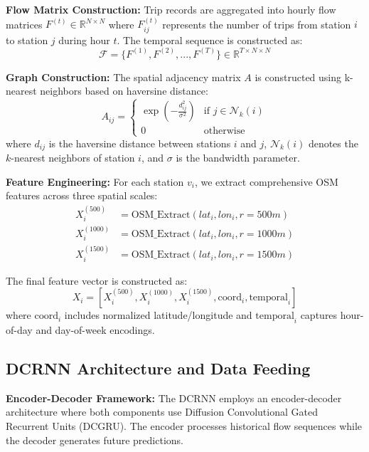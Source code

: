 \documentclass[twocolumn,11pt]{IEEEtran}
\begin{document}
\textbf{Flow Matrix Construction:}
Trip records are aggregated into hourly flow matrices $F^{(t)} \in \mathbb{R}^{N \times N}$ where $F_{ij}^{(t)}$ represents the number of trips from station $i$ to station $j$ during hour $t$. The temporal sequence is constructed as:
\begin{equation}
\mathcal{F} = \{F^{(1)}, F^{(2)}, ..., F^{(T)}\} \in \mathbb{R}^{T \times N \times N}
\end{equation}

\textbf{Graph Construction:}
The spatial adjacency matrix $A$ is constructed using k-nearest neighbors based on haversine distance:
\begin{equation}
A_{ij} = \begin{cases}
\exp(-\frac{d_{ij}^2}{\sigma^2}) & \text{if } j \in \mathcal{N}_k(i) \\
0 & \text{otherwise}
\end{cases}
\end{equation}
where $d_{ij}$ is the haversine distance between stations $i$ and $j$, $\mathcal{N}_k(i)$ denotes the $k$-nearest neighbors of station $i$, and $\sigma$ is the bandwidth parameter.

\textbf{Feature Engineering:}
For each station $v_i$, we extract comprehensive OSM features across three spatial scales:
\begin{align}
X_i^{(500)} &= \text{OSM\_Extract}(lat_i, lon_i, r=500m) \\
X_i^{(1000)} &= \text{OSM\_Extract}(lat_i, lon_i, r=1000m) \\
X_i^{(1500)} &= \text{OSM\_Extract}(lat_i, lon_i, r=1500m)
\end{align}

The final feature vector is constructed as:
\begin{equation}
X_i = [X_i^{(500)}, X_i^{(1000)}, X_i^{(1500)}, \text{coord}_i, \text{temporal}_i]
\end{equation}
where $\text{coord}_i$ includes normalized latitude/longitude and $\text{temporal}_i$ captures hour-of-day and day-of-week encodings.

\subsection{DCRNN Architecture and Data Feeding}

\textbf{Encoder-Decoder Framework:}
The DCRNN employs an encoder-decoder architecture where both components use Diffusion Convolutional Gated Recurrent Units (DCGRU). The encoder processes historical flow sequences while the decoder generates future predictions.
\end{document}
